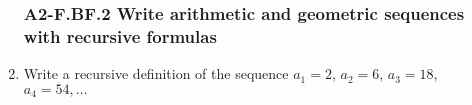 \documentclass[12pt, twoside]{article}
\begin{document}
\begin{enumerate}[itemsep=0.5cm]
\subsubsection*{A2-F.BF.2 Write arithmetic and geometric sequences with recursive formulas}
\item Write a recursive definition of the sequence $a_1 = 2$, $a_2 = 6$, $a_3 = 18$, $a_4 = 54, \ldots$ \vspace{2cm}

\end{enumerate}
\end{document}
